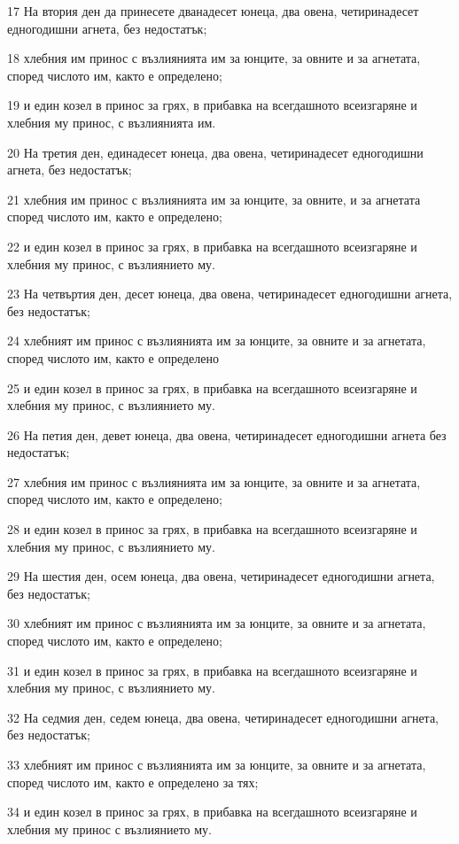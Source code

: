 \par 17 На втория ден да принесете дванадесет юнеца, два овена, четиринадесет едногодишни агнета, без недостатък;
\par 18 хлебния им принос с възлиянията им за юнците, за овните и за агнетата, според числото им, както е определено;
\par 19 и един козел в принос за грях, в прибавка на всегдашното всеизгаряне и хлебния му принос, с възлиянията им.
\par 20 На третия ден, единадесет юнеца, два овена, четиринадесет едногодишни агнета, без недостатък;
\par 21 хлебния им принос с възлиянията им за юнците, за овните, и за агнетата според числото им, както е определено;
\par 22 и един козел в принос за грях, в прибавка на всегдашното всеизгаряне и хлебния му принос, с възлиянието му.
\par 23 На четвъртия ден, десет юнеца, два овена, четиринадесет едногодишни агнета, без недостатък;
\par 24 хлебният им принос с възлиянията им за юнците, за овните и за агнетата, според числото им, както е определено
\par 25 и един козел в принос за грях, в прибавка на всегдашното всеизгаряне и хлебния му принос, с възлиянието му.
\par 26 На петия ден, девет юнеца, два овена, четиринадесет едногодишни агнета без недостатък;
\par 27 хлебния им принос с възлиянията им за юнците, за овните и за агнетата, според числото им, както е определено;
\par 28 и един козел в принос за грях, в прибавка на всегдашното всеизгаряне и хлебния му принос, с възлиянието му.
\par 29 На шестия ден, осем юнеца, два овена, четиринадесет едногодишни агнета, без недостатък;
\par 30 хлебният им принос с възлиянията им за юнците, за овните и за агнетата, според числото им, както е определено;
\par 31 и един козел в принос за грях, в прибавка на всегдашното всеизгаряне и хлебния му принос, с възлиянието му.
\par 32 На седмия ден, седем юнеца, два овена, четиринадесет едногодишни агнета, без недостатък;
\par 33 хлебният им принос с възлиянията им за юнците, за овните и за агнетата, според числото им, както е определено за тях;
\par 34 и един козел в принос за грях, в прибавка на всегдашното всеизгаряне и хлебния му принос с възлиянието му.
